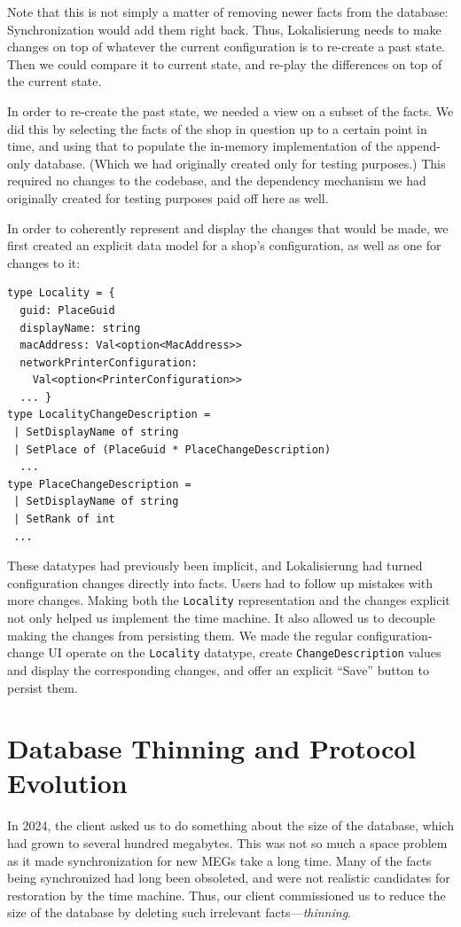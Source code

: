 \documentclass[sigplan,review]{acmart}
\begin{document}
Note that this is not simply a matter of removing newer facts from the
database: Synchronization would add them right back.
Thus, Lokalisierung needs to make changes on top of whatever the
current configuration is to re-create a past state.  Then we could
compare it to current state, and re-play the differences on top of the
current state.

In order to re-create the past state, we needed a view on a subset of
the facts. We did this by selecting the facts of the shop in question
up to a certain point in time, and using that to populate the
in-memory implementation of the append-only database.  (Which we had
originally created only for testing purposes.)  This required no
changes to the codebase, and the dependency mechanism we had
originally created for testing purposes paid off here as well.

In order to coherently represent and display the changes that would be
made, we first created an explicit data model for a shop's
configuration, as well as one for changes to it:
%
\begin{verbatim}
type Locality = {
  guid: PlaceGuid
  displayName: string
  macAddress: Val<option<MacAddress>>
  networkPrinterConfiguration:
    Val<option<PrinterConfiguration>>
  ... }
type LocalityChangeDescription =
 | SetDisplayName of string
 | SetPlace of (PlaceGuid * PlaceChangeDescription)
  ...
type PlaceChangeDescription =
 | SetDisplayName of string
 | SetRank of int
 ...
\end{verbatim}
%
These datatypes had previously been implicit, and
Lokalisierung had turned configuration changes directly into facts.
Users had to follow up mistakes with more
changes.  Making both the \texttt{Locality} representation and the
changes explicit not only helped us implement the time machine.  It
also allowed us to decouple making the changes from persisting them.
We made the regular configuration-change UI operate on the
\texttt{Locality} datatype, create \texttt{ChangeDescription} values
and display the corresponding changes, and offer an explicit ``Save''
button to persist them.

\section{Database Thinning and Protocol Evolution}
\label{sec:thinning}

In 2024, the client asked us to do something about the size of the
database, which had grown to several hundred megabytes.  This was not
so much a space problem as it made synchronization for new MEGs take a
long time.
Many of the facts being synchronized had long been obsoleted, and were
not realistic candidates for restoration by the time machine.  Thus,
our client commissioned us to reduce the size of the database by
deleting such irrelevant facts---\textit{thinning}.
\end{document}
